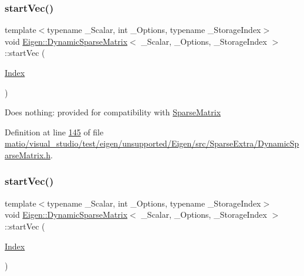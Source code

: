 \subsubsection{\texorpdfstring{start\+Vec()}{startVec()}\hspace{0.1cm}{\footnotesize\ttfamily [1/2]}}
{\footnotesize\ttfamily template$<$typename \+\_\+\+Scalar, int \+\_\+\+Options, typename \+\_\+\+Storage\+Index$>$ \\
void \hyperlink{class_eigen_1_1_dynamic_sparse_matrix}{Eigen\+::\+Dynamic\+Sparse\+Matrix}$<$ \+\_\+\+Scalar, \+\_\+\+Options, \+\_\+\+Storage\+Index $>$\+::start\+Vec (\begin{DoxyParamCaption}\item[{\hyperlink{group___core___module_a554f30542cc2316add4b1ea0a492ff02}{Index}}]{ }\end{DoxyParamCaption})\hspace{0.3cm}{\ttfamily [inline]}}

Does nothing\+: provided for compatibility with \hyperlink{group___sparse_core___module_class_eigen_1_1_sparse_matrix}{Sparse\+Matrix} 

Definition at line \hyperlink{matio_2visual__studio_2test_2eigen_2unsupported_2_eigen_2src_2_sparse_extra_2_dynamic_sparse_matrix_8h_source_l00145}{145} of file \hyperlink{matio_2visual__studio_2test_2eigen_2unsupported_2_eigen_2src_2_sparse_extra_2_dynamic_sparse_matrix_8h_source}{matio/visual\+\_\+studio/test/eigen/unsupported/\+Eigen/src/\+Sparse\+Extra/\+Dynamic\+Sparse\+Matrix.\+h}.

\mbox{\label{class_eigen_1_1_dynamic_sparse_matrix_a294b998a50cc01859425e5e7c23d6108}} 
\subsubsection{\texorpdfstring{start\+Vec()}{startVec()}\hspace{0.1cm}{\footnotesize\ttfamily [2/2]}}
{\footnotesize\ttfamily template$<$typename \+\_\+\+Scalar, int \+\_\+\+Options, typename \+\_\+\+Storage\+Index$>$ \\
void \hyperlink{class_eigen_1_1_dynamic_sparse_matrix}{Eigen\+::\+Dynamic\+Sparse\+Matrix}$<$ \+\_\+\+Scalar, \+\_\+\+Options, \+\_\+\+Storage\+Index $>$\+::start\+Vec (\begin{DoxyParamCaption}\item[{\hyperlink{group___core___module_a554f30542cc2316add4b1ea0a492ff02}{Index}}]{ }\end{DoxyParamCaption})\hspace{0.3cm}{\ttfamily [inline]}}


